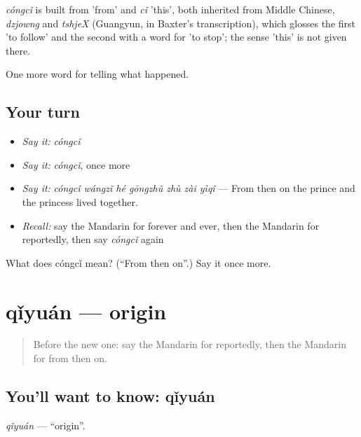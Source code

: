 \begin{cousinweb}
\emph{cóngcǐ} is built from  'from' and \emph{cǐ} 'this', both inherited from Middle Chinese, \emph{dzjowng} and \emph{tshjeX} (Guangyun, in Baxter's transcription), which glosses the first 'to follow' and the second with a word for 'to stop'; the sense 'this' is not given there.
\end{cousinweb}

\begin{grammarlens}[title={What you've built}]
One more word for telling what happened.
\end{grammarlens}

\subsection*{Your turn}
\begin{itemize}
\raggedright
  \item \emph{Say it:} \emph{cóngcǐ}
  \item \emph{Say it:} \emph{cóngcǐ}, once more
  \item \emph{Say it:} \emph{cóngcǐ wángzǐ hé gōngzhǔ zhù zài yìqǐ} — From then on the prince and the princess lived together.
  \item \emph{Recall:} say the Mandarin for forever and ever, then the Mandarin for reportedly, then say \emph{cóngcǐ} again
\end{itemize}

\begin{tcolorbox}[breakable,colback=teal!4,colframe=teal!35!black,title={Before you move on}]
What does cóngcǐ mean? (\textquotedblleft{}From then on\textquotedblright{}.) Say it once more.
\end{tcolorbox}
\section[qǐyuán]{qǐyuán — origin}

\label{lesson:ZH-C345-qiyuan}



\begin{quote}
Before the new one: say the Mandarin for reportedly, then the Mandarin for from then on.
\end{quote}

\subsection*{You'll want to know: qǐyuán}
\emph{qǐyuán} — \textquotedblleft{}origin\textquotedblright{}.

